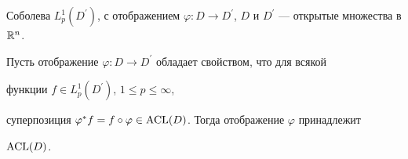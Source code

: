 Соболева $L^1_p(D^{\prime})$, с отображением $\varphi : D\to


D^{\prime}$, $D$ и $D^{\prime}$ --- открытые множества в ${\Bbb R}^n$.





\begin{prop}


Пусть отображение $\varphi


: D\to D^{\prime}$ обладает свойством, что для всякой


функции $f\in L^1_p(D^{\prime})$, $1\leq p\leq\infty$,


суперпозиция $\varphi^{\ast}f = f\circ\varphi


\in\ACL(D)$. Тогда отображение $\varphi$ принадлежит


$\operatorname{ACL}(D)$.


\end{prop}





